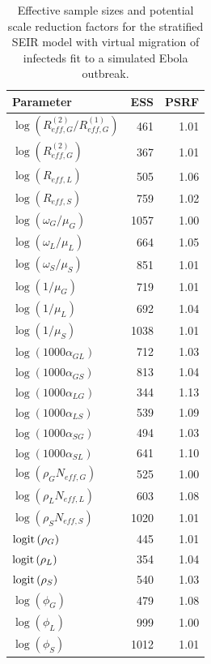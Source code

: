 \begin{table}[htbp]
	\caption{Effective sample sizes and potential scale reduction factors for the stratified SEIR model with virtual migration of infecteds fit to a simulated Ebola outbreak.}
	\centering\small
	\begin{tabular}{lrr}
		\hline
		\textbf{Parameter} & \textbf{ESS} & \textbf{PSRF} \\ 
		\hline
		$ \log\left (R_{eff,G}^{(2)} / R_{eff,G}^{(1)}\right ) $& 461 & 1.01 \\ 
		$ \log\left (R_{eff,G}^{(2)}\right ) $& 367 & 1.01 \\ 
		$ \log\left (R_{eff,L}\right ) $& 505 & 1.06 \\ 
		$ \log\left (R_{eff,S}\right ) $& 759 & 1.02 \\ 
		$ \log\left (\omega_G / \mu_G\right ) $& 1057 & 1.00 \\ 
		$ \log\left (\omega_L / \mu_L\right ) $& 664 & 1.05 \\ 
		$ \log\left (\omega_S / \mu_S\right ) $& 851 & 1.01 \\ 
		$ \log\left (1/\mu_G\right ) $& 719 & 1.01 \\ 
		$ \log\left (1/\mu_L\right ) $& 692 & 1.04 \\ 
		$ \log\left (1/\mu_S\right ) $& 1038 & 1.01 \\ 
		$ \log\left (1000\alpha_{GL}\right ) $& 712 & 1.03 \\ 
		$ \log\left (1000\alpha_{GS}\right ) $& 813 & 1.04 \\ 
		$ \log\left (1000\alpha_{LG}\right ) $& 344 & 1.13 \\ 
		$ \log\left (1000\alpha_{LS}\right ) $& 539 & 1.09 \\ 
		$ \log\left (1000\alpha_{SG}\right ) $& 494 & 1.03 \\ 
		$ \log\left (1000\alpha_{SL}\right ) $& 641 & 1.10 \\ 
		$ \log\left (\rho_GN_{eff,G}\right ) $& 525 & 1.00 \\ 
		$ \log\left (\rho_LN_{eff,L}\right ) $& 603 & 1.08 \\ 
		$ \log\left (\rho_SN_{eff,S}\right ) $& 1020 & 1.01 \\ 
		$ \mathrm{logit}\left (\rho_G\right ) $& 445 & 1.01 \\ 
		$ \mathrm{logit}\left (\rho_L\right ) $& 354 & 1.04 \\ 
		$ \mathrm{logit}\left (\rho_S\right ) $& 540 & 1.03 \\ 
		$ \log(\phi_G) $& 479 & 1.08 \\ 
		$ \log(\phi_L) $& 999 & 1.00 \\ 
		$ \log(\phi_S) $& 1012 & 1.01 \\ 
		\hline
	\end{tabular}
\end{table}

